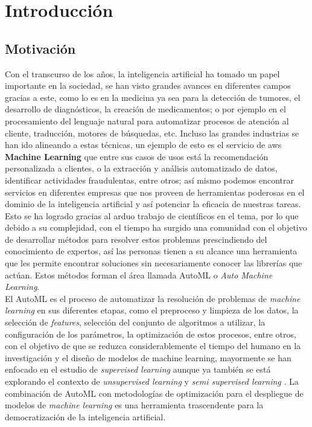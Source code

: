 \chapter*{Introducción}\label{chapter:introduction}

\section*{Motivación}
Con el transcurso de los años, la inteligencia artificial ha tomado un papel importante en la sociedad, se han visto grandes avances en diferentes campos gracias a este, como lo es en la medicina ya sea para la detección de tumores, el desarrollo de diagnósticos, la creación de medicamentos; o por ejemplo en el procesamiento del lenguaje natural para automatizar procesos de atención al cliente, traducción, motores de búsquedas, etc. Incluso las grandes industrias se han ido alineando a estas técnicas, un ejemplo de esto es el servicio de aws \textbf{Machine Learning} que entre sus casos de usos está la recomendación personalizada a clientes, o la extracción y análisis automatizado de datos, identificar actividades fraudulentas, entre otros; así mismo podemos encontrar servicios en diferentes empresas que nos proveen de herramientas poderosas en el dominio de la inteligencia artificial y así potenciar la eficacia de nuestras tareas. Esto se ha logrado gracias al arduo trabajo de científicos en el tema, por lo que debido a su complejidad, con el tiempo ha surgido una comunidad con el objetivo de desarrollar métodos para resolver estos problemas prescindiendo del conocimiento de expertos, así las personas tienen a su alcance una herramienta que les permite encontrar soluciones sin necesariamente conocer las librerías que actúan. Estos métodos forman el área llamada AutoML o \textit{Auto Machine Learning}.\\

El AutoML es el proceso de automatizar la resolución de problemas de \textit{machine learning} en sus diferentes etapas, como el preproceso y limpieza de los datos, la selección de \textit{features}, selección del conjunto de algoritmos a utilizar, la configuración de los parámetros, la optimización de estos procesos, entre otros, con el objetivo de que se reduzca considerablemente el tiempo del humano en la investigación y el diseño de modelos de machine learning, mayormente se han enfocado en el estudio de \textit{supervised learning} aunque ya también se está explorando el contexto de \textit{unsupervised learning} \parencite{1} y \textit{semi supervised learning} \parencite{2}. La combinación de AutoML con metodologías de optimización para el despliegue de modelos de \textit{machine learning} es una herramienta trascendente para la democratización de la inteligencia artificial.\\

